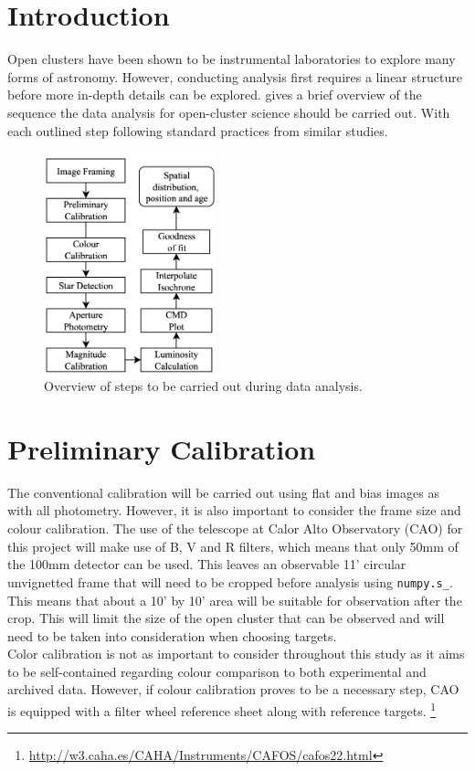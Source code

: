 
\section{Introduction} \label{sec:intro}

Open clusters have been shown to be instrumental laboratories to explore many forms of astronomy. However, conducting analysis first requires a linear structure before more in-depth details can be explored.  gives a brief overview of the sequence the data analysis for open-cluster science should be carried out. With each outlined step following standard practices from similar studies. 

\begin{figure}[h!]
    \centering
    \includegraphics[width = 5cm]{figures/steps.png}
    \caption{Overview of steps to be carried out during data analysis. }
    \label{fig: steps}
\end{figure}

\section{Preliminary Calibration}
The conventional calibration will be carried out using flat and bias images as with all photometry. However, it is also important to consider the frame size and colour calibration. The use of the telescope at Calor Alto Observatory (CAO) for this project will make use of B, V and R filters, which means that only 50mm of the 100mm detector can be used. This leaves an observable 11' circular unvignetted frame that will need to be cropped before analysis using \verb|numpy.s_|. \\ This means that about a 10' by 10' area will be suitable for observation after the crop. This will limit the size of the open cluster that can be observed and will need to be taken into consideration when choosing targets. \\ Color calibration is not as important to consider throughout this study as it aims to be self-contained regarding colour comparison to both experimental and archived data. However, if colour calibration proves to be a necessary step, CAO is equipped with a filter wheel reference sheet along with reference targets. \footnote{\url{http://w3.caha.es/CAHA/Instruments/CAFOS/cafos22.html}} 

